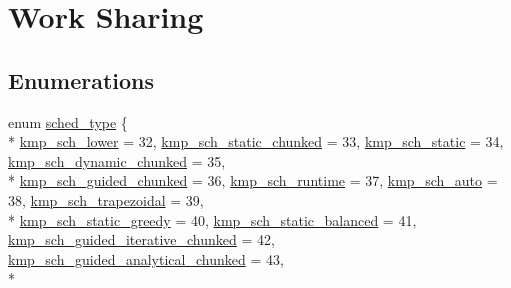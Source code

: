 \hypertarget{group__WORK__SHARING}{\section{Work Sharing}
\label{group__WORK__SHARING}
}
\subsection*{Enumerations}
\begin{DoxyCompactItemize}
\item 
enum \hyperlink{group__WORK__SHARING_gadcaf200537aaa0218a60c398438f81be}{sched\-\_\-type} \{ \\*
\hyperlink{group__WORK__SHARING_ggadcaf200537aaa0218a60c398438f81bea7ed3535e3c97c9c2ce299addd74b4a01}{kmp\-\_\-sch\-\_\-lower} = 32, 
\hyperlink{group__WORK__SHARING_ggadcaf200537aaa0218a60c398438f81bea8521b598e4c2014936813c104adfab4b}{kmp\-\_\-sch\-\_\-static\-\_\-chunked} = 33, 
\hyperlink{group__WORK__SHARING_ggadcaf200537aaa0218a60c398438f81bea2a987351b9605b918693a17d4dd90772}{kmp\-\_\-sch\-\_\-static} = 34, 
\hyperlink{group__WORK__SHARING_ggadcaf200537aaa0218a60c398438f81bea55ec779ed16f7959a24e65feadcbdbeb}{kmp\-\_\-sch\-\_\-dynamic\-\_\-chunked} = 35, 
\\*
\hyperlink{group__WORK__SHARING_ggadcaf200537aaa0218a60c398438f81bea52b66fc7ba82beb3d6fbdb82a6ef045d}{kmp\-\_\-sch\-\_\-guided\-\_\-chunked} = 36, 
\hyperlink{group__WORK__SHARING_ggadcaf200537aaa0218a60c398438f81bea2cae9ebb984349b75fe470cc6aa4cd19}{kmp\-\_\-sch\-\_\-runtime} = 37, 
\hyperlink{group__WORK__SHARING_ggadcaf200537aaa0218a60c398438f81bea270b6b98ec2f9ec4832f7a59b0a0d532}{kmp\-\_\-sch\-\_\-auto} = 38, 
\hyperlink{group__WORK__SHARING_ggadcaf200537aaa0218a60c398438f81bea904631666318a8490fc48df394616dbd}{kmp\-\_\-sch\-\_\-trapezoidal} = 39, 
\\*
\hyperlink{group__WORK__SHARING_ggadcaf200537aaa0218a60c398438f81bea67c1b7c70c012361c0218269ac063606}{kmp\-\_\-sch\-\_\-static\-\_\-greedy} = 40, 
\hyperlink{group__WORK__SHARING_ggadcaf200537aaa0218a60c398438f81bea5869a7f3c202fef826c9368fa155dcdb}{kmp\-\_\-sch\-\_\-static\-\_\-balanced} = 41, 
\hyperlink{group__WORK__SHARING_ggadcaf200537aaa0218a60c398438f81beaa6177807dac327b1240c43ab9f2d1f12}{kmp\-\_\-sch\-\_\-guided\-\_\-iterative\-\_\-chunked} = 42, 
\hyperlink{group__WORK__SHARING_ggadcaf200537aaa0218a60c398438f81bea569ad1692047e89645f19bca3f2c26af}{kmp\-\_\-sch\-\_\-guided\-\_\-analytical\-\_\-chunked} = 43, 
\\*

\end{DoxyCompactItemize}
